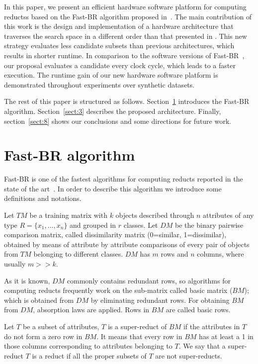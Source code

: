 \documentclass[authoryear,preprint,review,12pt]{elsarticle}
\begin{document}
In this paper, we present an efficient hardware software platform for computing reductss based on the Fast-BR algorithm proposed in~\citep{Lias13}. The main contribution of this work is the design and implementation of a hardware architecture that traverses the search space in a different order than that presented in \citep{R11, R21,Rod14}. This new strategy evaluates less candidate subsets than previous architectures, which results in shorter runtime. In comparison to the software versions of Fast-BR~\citep{R22, R23}, our proposal evaluates a candidate every clock cycle, which leads to a faster execution. The runtime gain of our new hardware software platform is demonstrated throughout experiments over synthetic datasets. 

The rest of this paper is structured as follows. Section~\ref{sect:2} introduces the Fast-BR algorithm. Section~\ref{sect:3} describes the proposed architecture. Finally, section~\ref{sect:8} shows our conclusions and some directions for future work.


\section{Fast-BR algorithm}
\label{sect:2}
Fast-BR is one of the fastest algorithms for computing reducts reported in the 
state of the art~\citep{R22,R23,Piza13}. In order to describe this algorithm we introduce some definitions 
and notations.


Let $TM$ be a training matrix with $k$ objects described through $n$
attributes of any type $R=\{x_{1},\ldots,x_{n}\}$ and grouped in $r$
classes. Let $DM$ be the binary pairwise comparison matrix, called dissimilarity matrix 
(0=similar, 1=dissimilar), obtained by means of attribute by attribute comparisons of every
pair of objects from $TM$ belonging to different classes. $DM$ has
$m$ rows and $n$ columns, where usually $m>>k$.

As it is known, $DM$ commonly contains redundant rows, so algorithms
for computing reducts frequently work on the sub-matrix called basic matrix ($BM$);
which is obtained from $DM$ by eliminating redundant rows. For obtaining
$BM$ from $DM$, absorption laws are applied. Rows in $BM$ are called basic rows.

Let $T$ be a subset of attributes, $T$ is a super-reduct of $BM$ if the attributes in $T$ do not form a zero row in $BM$. It means that every row in $BM$ has at least a 1 in those columns corresponding to attributes belonging to $T$. We say that a super-reduct $T$ is a reduct if all the proper subsets of $T$ are not super-reducts.
\end{document}
